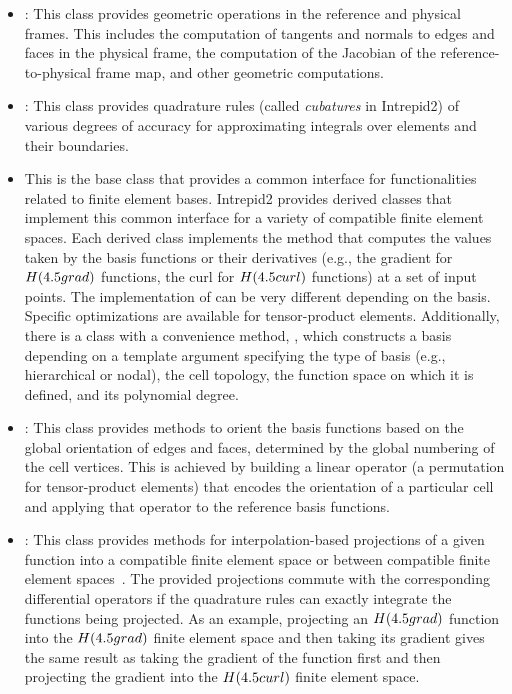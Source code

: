\begin{itemize}
\item {}: This class provides geometric operations in the reference and physical frames. This includes the computation of tangents and normals to edges and faces in the physical frame, the computation of the Jacobian of the reference-to-physical frame map, and other geometric computations.
\item {}: This class provides quadrature rules (called \emph{cubatures} in Intrepid2) of various degrees of accuracy for approximating integrals over elements and their boundaries.
\item {} This is the base class that provides a common interface for functionalities related to finite element bases. Intrepid2 provides derived classes that implement this common interface for a variety of compatible finite element spaces. Each derived class implements the  method that computes the values taken by the basis functions or their derivatives (e.g., the gradient for $H({\rm grad})$ functions, the curl for $H({\rm curl})$ functions) at a set of input points. The implementation of  can be very different depending on the basis. Specific optimizations are available for tensor-product elements.  Additionally, there is a  class with a convenience method, , which constructs a basis depending on a template argument specifying the type of basis (e.g., hierarchical or nodal), the cell topology, the function space on which it is defined, and its polynomial degree.
\item {}: This class provides methods to orient the basis functions based on the global orientation of edges and faces, determined by the global numbering of the cell vertices. This is achieved by building a linear operator (a permutation for tensor-product elements) that encodes the orientation of a particular cell and applying that operator to the reference basis functions.
\item {}: This class provides methods for interpolation-based projections of a given function into a compatible finite element space or between compatible finite element spaces~\cite{demkowicz2007}. The provided projections commute with the corresponding differential operators if the quadrature rules can exactly integrate the functions being projected. As an example, projecting an $H({\rm grad})$ function into the $H({\rm grad})$ finite element space and then taking its gradient gives the same result as taking the gradient of the function first and then projecting the gradient into the $H({\rm curl})$ finite element space.

\end{itemize}
